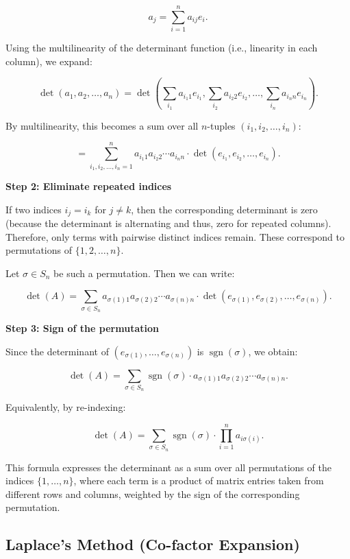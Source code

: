 \[
a_j = \sum_{i=1}^n a_{ij} e_i.
\]

Using the multilinearity of the determinant function (i.e., linearity in each column), we expand:

\[
\det(a_1, a_2, \dots, a_n) = \det\left( \sum_{i_1} a_{i_1 1} e_{i_1}, \sum_{i_2} a_{i_2 2} e_{i_2}, \dots, \sum_{i_n} a_{i_n n} e_{i_n} \right).
\]

By multilinearity, this becomes a sum over all \( n \)-tuples \( (i_1, i_2, \dots, i_n) \):

\[
= \sum_{i_1, i_2, \dots, i_n = 1}^n a_{i_1 1} a_{i_2 2} \cdots a_{i_n n} \cdot \det(e_{i_1}, e_{i_2}, \dots, e_{i_n}).
\]

\textbf{Step 2: Eliminate repeated indices}

If two indices \( i_j = i_k \) for \( j \neq k \), then the corresponding 
determinant is zero (because the determinant is alternating and thus, zero for repeated columns). 
Therefore, only terms with pairwise distinct indices remain. These correspond to permutations of \( \{1, 2, \dots, n\} \).

Let \( \sigma \in S_n \) be such a permutation. Then we can write:

\[
\det(A) = \sum_{\sigma \in S_n} a_{\sigma(1) 1} a_{\sigma(2) 2} \cdots a_{\sigma(n) n} \cdot \det(e_{\sigma(1)}, e_{\sigma(2)}, \dots, e_{\sigma(n)}).
\]

\textbf{Step 3: Sign of the permutation}

Since the determinant of \( (e_{\sigma(1)}, \dots, e_{\sigma(n)}) \) is \( \operatorname{sgn}(\sigma) \), we obtain:

\[
\det(A) = \sum_{\sigma \in S_n} \operatorname{sgn}(\sigma) \cdot a_{\sigma(1)1} a_{\sigma(2)2} \cdots a_{\sigma(n)n}.
\]

Equivalently, by re-indexing:

\[
\det(A) = \sum_{\sigma \in S_n} \operatorname{sgn}(\sigma) \cdot \prod_{i=1}^n a_{i \sigma(i)}.
\]


This formula expresses the determinant as a sum over all permutations of the indices \( \{1, \dots, n\} \), where each term is a product of matrix entries taken from different rows and columns, weighted by the sign of the corresponding permutation.


\subsection{Laplace's Method (Co-factor Expansion)}

